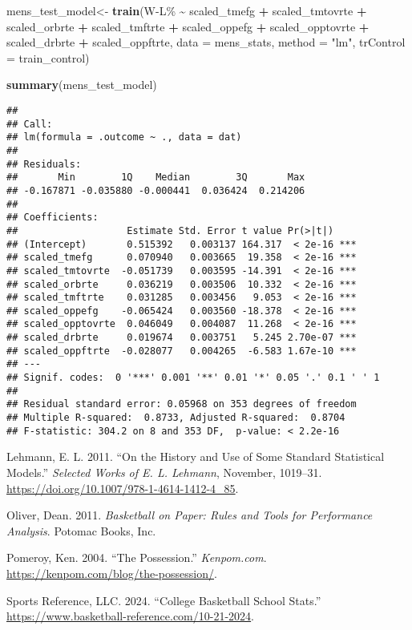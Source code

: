 \documentclass[
]{article}
\newenvironment{Shaded}{\begin{snugshade}}{\end{snugshade}}
\newcommand{\AttributeTok}[1]{\textcolor[rgb]{0.13,0.29,0.53}{#1}}
\newcommand{\FunctionTok}[1]{\textcolor[rgb]{0.13,0.29,0.53}{\textbf{#1}}}
\newcommand{\NormalTok}[1]{#1}
\newcommand{\OtherTok}[1]{\textcolor[rgb]{0.56,0.35,0.01}{#1}}
\newcommand{\SpecialCharTok}[1]{\textcolor[rgb]{0.81,0.36,0.00}{\textbf{#1}}}
\newcommand{\StringTok}[1]{\textcolor[rgb]{0.31,0.60,0.02}{#1}}
\newlength{\cslhangindent}
\newenvironment{CSLReferences}[2] %
 {\begin{list}{}{%
  \setlength{\itemindent}{0pt}
  \setlength{\leftmargin}{0pt}
  \setlength{\parsep}{0pt}
  \ifodd #1
   \setlength{\leftmargin}{\cslhangindent}
   \setlength{\itemindent}{-1\cslhangindent}
  \fi
  \setlength{\itemsep}{#2\baselineskip}}}
 {\end{list}}
\begin{document}
\begin{Shaded}
\begin{Highlighting}[]
\NormalTok{mens\_test\_model}\OtherTok{\textless{}{-}} \FunctionTok{train}\NormalTok{(}\StringTok{\textasciigrave{}}\AttributeTok{W{-}L\%}\StringTok{\textasciigrave{}} \SpecialCharTok{\textasciitilde{}}\NormalTok{ scaled\_tmefg }\SpecialCharTok{+}\NormalTok{ scaled\_tmtovrte }\SpecialCharTok{+}\NormalTok{ scaled\_orbrte }\SpecialCharTok{+}\NormalTok{ scaled\_tmftrte }\SpecialCharTok{+}\NormalTok{ scaled\_oppefg }\SpecialCharTok{+}\NormalTok{ scaled\_opptovrte }\SpecialCharTok{+}\NormalTok{ scaled\_drbrte }\SpecialCharTok{+}\NormalTok{ scaled\_oppftrte, }\AttributeTok{data =}\NormalTok{ mens\_stats, }\AttributeTok{method =} \StringTok{"lm"}\NormalTok{, }\AttributeTok{trControl =}\NormalTok{ train\_control)}

\FunctionTok{summary}\NormalTok{(mens\_test\_model)}
\end{Highlighting}
\end{Shaded}

\begin{verbatim}
## 
## Call:
## lm(formula = .outcome ~ ., data = dat)
## 
## Residuals:
##       Min        1Q    Median        3Q       Max 
## -0.167871 -0.035880 -0.000441  0.036424  0.214206 
## 
## Coefficients:
##                   Estimate Std. Error t value Pr(>|t|)    
## (Intercept)       0.515392   0.003137 164.317  < 2e-16 ***
## scaled_tmefg      0.070940   0.003665  19.358  < 2e-16 ***
## scaled_tmtovrte  -0.051739   0.003595 -14.391  < 2e-16 ***
## scaled_orbrte     0.036219   0.003506  10.332  < 2e-16 ***
## scaled_tmftrte    0.031285   0.003456   9.053  < 2e-16 ***
## scaled_oppefg    -0.065424   0.003560 -18.378  < 2e-16 ***
## scaled_opptovrte  0.046049   0.004087  11.268  < 2e-16 ***
## scaled_drbrte     0.019674   0.003751   5.245 2.70e-07 ***
## scaled_oppftrte  -0.028077   0.004265  -6.583 1.67e-10 ***
## ---
## Signif. codes:  0 '***' 0.001 '**' 0.01 '*' 0.05 '.' 0.1 ' ' 1
## 
## Residual standard error: 0.05968 on 353 degrees of freedom
## Multiple R-squared:  0.8733, Adjusted R-squared:  0.8704 
## F-statistic: 304.2 on 8 and 353 DF,  p-value: < 2.2e-16
\end{verbatim}

\label{refs}
\begin{CSLReferences}{1}{0}
Lehmann, E. L. 2011. {``On the History and Use of Some Standard
Statistical Models.''} \emph{Selected Works of E. L. Lehmann}, November,
1019--31. \url{https://doi.org/10.1007/978-1-4614-1412-4_85}.

Oliver, Dean. 2011. \emph{Basketball on Paper: Rules and Tools for
Performance Analysis}. Potomac Books, Inc.

Pomeroy, Ken. 2004. {``The Possession.''} \emph{Kenpom.com}.
\url{https://kenpom.com/blog/the-possession/}.

Sports Reference, LLC. 2024. {``College Basketball School Stats.''}
\url{https://www.basketball-reference.com/10-21-2024}.

\end{CSLReferences}
\end{document}
